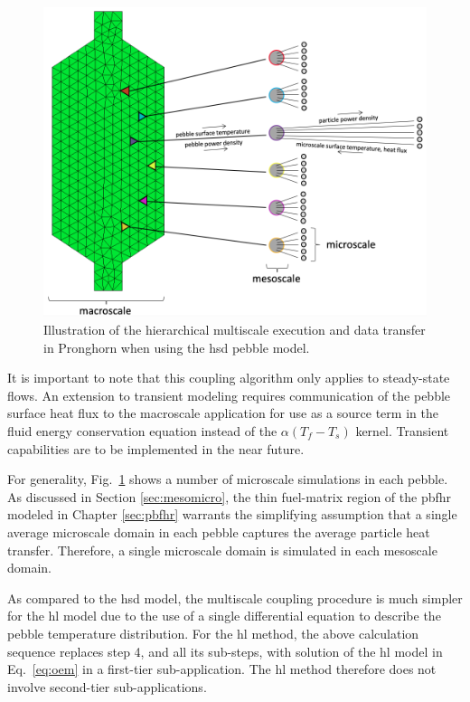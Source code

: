 \begin{figure}[!h]
\centering
\includegraphics[width=0.8\linewidth]{figs/multiscale_pbr_d.png}
\caption{Illustration of the hierarchical multiscale execution and data transfer in Pronghorn when using the \gls{hsd} pebble model.}
\label{fig:multiscale_pbr}
\end{figure}

It is important to note that this coupling algorithm only applies to steady-state flows. An extension to transient modeling requires communication of the pebble surface heat flux to the macroscale application for use as a source term in the fluid energy conservation equation instead of the \(\alpha(T_f-T_s)\) kernel. Transient capabilities are to be implemented in the near future. 

For generality, Fig.\ \ref{fig:multiscale_pbr} shows a number of microscale simulations in each pebble. As discussed in Section \ref{sec:mesomicro}, the thin fuel-matrix region of the \gls{pbfhr} modeled in Chapter \ref{sec:pbfhr} warrants the simplifying assumption that a single average microscale domain in each pebble captures the average particle heat transfer. Therefore, a single microscale domain is simulated in each mesoscale domain.

As compared to the \gls{hsd} model, the multiscale coupling procedure is much simpler for the \gls{hl} model due to the use of a single differential equation to describe the pebble temperature distribution. For the \gls{hl} method, the above calculation sequence replaces step 4, and all its sub-steps, with solution of the \gls{hl} model in Eq.\ \eqref{eq:oem} in a first-tier sub-application. The \gls{hl} method therefore does not involve second-tier sub-applications. 

